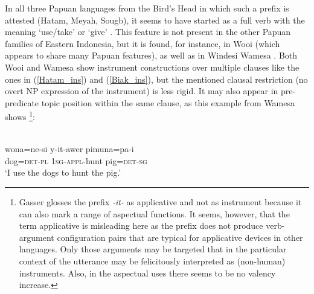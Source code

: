 In all three Papuan languages from the Bird's Head in which such a prefix is attested (Hatam, Meyah, Sougb), it seems to have started as a full verb with the meaning `use/take' or `give' \citep[194]{reesink2005west}. This feature is not present in the other Papuan families of Eastern Indonesia, but it is found, for instance, in Wooi (which appears to share many Papuan features), as well as in Windesi Wamesa \citep[188ff.]{gasser2014windesi}. Both Wooi and Wamesa show instrument constructions over multiple clauses like the ones in (\ref{Hatam_ins}) and (\ref{Biak_ins}), but the mentioned clausal restriction (no overt NP expression of the instrument) is less rigid. It may also appear in pre-predicate topic position within the same clause, as this example from Wamesa shows \footnote{Gasser glosses the prefix \textit{-it-} as applicative and not as instrument because it can also mark a range of aspectual functions. It seems, however, that the term applicative is misleading here as the prefix does not produce verb-argument configuration pairs that are typical for applicative devices in other languages. Only those arguments may be targeted that in the particular context of the utterance may be felicitously interpreted as (non-human) instruments. Also, in the aspectual uses there seems to be no valency increase.}:

\ea 
{}\\
\gll wona=ne-si y-it-awer pimuna=pa-i \\
dog=\textsc{det}-\textsc{pl} \textsc{1}\textsc{sg}-\textsc{appl}-hunt pig=\textsc{det}-\textsc{sg} \\
\glft `I use the dogs to hunt the pig.'\\ 
\z

